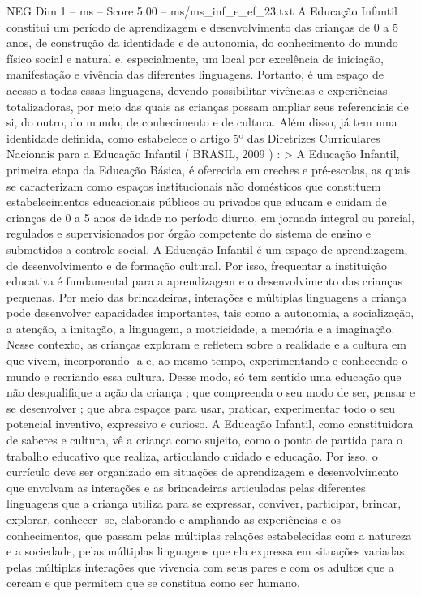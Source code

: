 \begin{textsample}{NEG Dim 1 – ms – Score 5.00 – ms/ms\_inf\_e\_ef\_23.txt}
A Educação Infantil constitui um período de aprendizagem e desenvolvimento das crianças de 0 a 5 anos, de construção da identidade e de autonomia, do conhecimento do mundo físico social e natural e, especialmente, um local por excelência de iniciação, manifestação e vivência das diferentes linguagens.
Portanto, é um espaço de acesso a todas essas linguagens, devendo possibilitar vivências e experiências totalizadoras, por meio das quais as crianças possam ampliar seus referenciais de si, do outro, do mundo, de conhecimento e de cultura.
Além disso, já tem uma identidade definida, como estabelece o artigo 5º das Diretrizes Curriculares Nacionais para a Educação Infantil ( BRASIL, 2009 ) : > A Educação Infantil, primeira etapa da Educação Básica, é oferecida em creches e pré-escolas, as quais se caracterizam como espaços institucionais não domésticos que constituem estabelecimentos educacionais públicos ou privados que educam e cuidam de crianças de 0 a 5 anos de idade no período diurno, em jornada integral ou parcial, regulados e supervisionados por órgão competente do sistema de ensino e submetidos a controle social.
A Educação Infantil é um espaço de aprendizagem, de desenvolvimento e de formação cultural.
Por isso, frequentar a instituição educativa é fundamental para a aprendizagem e o desenvolvimento das crianças pequenas.
Por meio das brincadeiras, interações e múltiplas linguagens a criança pode desenvolver capacidades importantes, tais como a autonomia, a socialização, a atenção, a imitação, a linguagem, a motricidade, a memória e a imaginação.
Nesse contexto, as crianças exploram e refletem sobre a realidade e a cultura em que vivem, incorporando -a e, ao mesmo tempo, experimentando e conhecendo o mundo e recriando essa cultura.
Desse modo, só tem sentido uma educação que não desqualifique a ação da criança ; que compreenda o seu modo de ser, pensar e se desenvolver ; que abra espaços para usar, praticar, experimentar todo o seu potencial inventivo, expressivo e curioso.
A Educação Infantil, como constituidora de saberes e cultura, vê a criança como sujeito, como o ponto de partida para o trabalho educativo que realiza, articulando cuidado e educação.
Por isso, o currículo deve ser organizado em situações de aprendizagem e desenvolvimento que envolvam as interações e as brincadeiras articuladas pelas diferentes linguagens que a criança utiliza para se expressar, conviver, participar, brincar, explorar, conhecer -se, elaborando e ampliando as experiências e os conhecimentos, que passam pelas múltiplas relações estabelecidas com a natureza e a sociedade, pelas múltiplas linguagens que ela expressa em situações variadas, pelas múltiplas interações que vivencia com seus pares e com os adultos que a cercam e que permitem que se constitua como ser humano.

\end{textsample}

